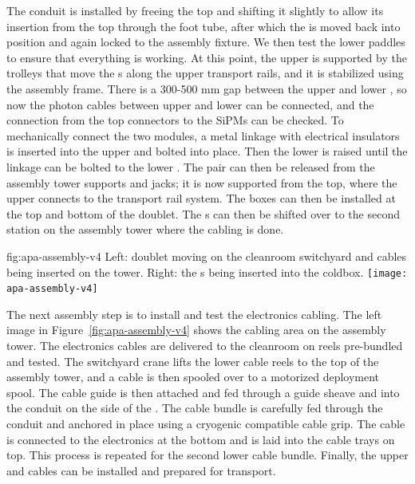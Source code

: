 The conduit is installed by freeing the top  and shifting it slightly to allow its insertion from the top through the foot tube, after which  
the  is moved back into position and again locked to the  assembly fixture.
We then test the lower   paddles %
to ensure that everything is working. 
At this point, the upper  is supported by the trolleys  that move the s along the upper transport rails, and it is stabilized using the  assembly frame. There is a 300-500 \si{mm} gap between the upper and lower , so now the photon cables between upper and lower  can be connected, and the connection from the top connectors to the SiPMs can be checked. 
To mechanically connect the two  modules, a metal linkage with electrical insulators is inserted into the upper  and bolted into place. Then the lower  is raised until the linkage can be bolted to the lower .  
The  pair can then be released from the assembly tower supports and jacks; it is now supported from the top, where the upper  connects to the transport rail system. The  boxes can then be installed at the top and bottom of the  doublet. The s can then be shifted over to the second station on the assembly tower where the cabling is done.




\begin{dunefigure}{fig:apa-assembly-v4}
  { Left:  doublet moving on the cleanroom switchyard and cables being inserted on the tower. Right: the s being inserted into the coldbox.}
\texttt{[image: apa-assembly-v4]}

\end{dunefigure}

The next assembly step is to install and test the electronics cabling.  The left image in Figure~\ref{fig:apa-assembly-v4} shows the  cabling area on the  assembly tower. 
The electronics cables are delivered to the cleanroom on reels pre-bundled and tested. 
The switchyard crane lifts the lower  cable reels to the top of the assembly tower, and a cable is then spooled over to a motorized deployment spool. 
The cable guide is then attached and fed through a guide sheave and into the conduit on the side of the . The cable bundle is carefully fed through the conduit and anchored in place using a cryogenic compatible cable grip. The cable is connected to the electronics at the bottom and is laid into the cable trays on top. This process is repeated for the second lower  cable bundle. 
Finally, the upper  and  cables can be installed and prepared for transport.

